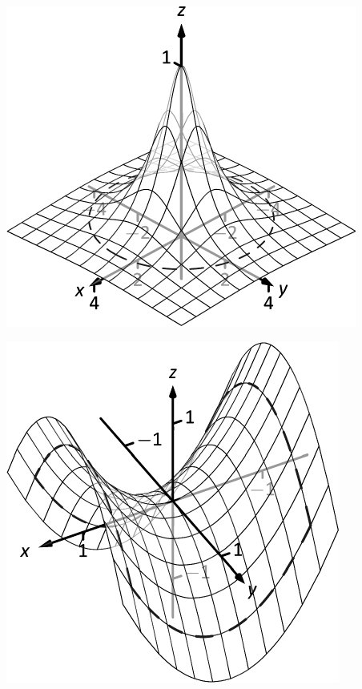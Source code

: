 \documentclass[10pt]{article}
\begin{document}
\includegraphics{fig13_05_ex_06_3DBW.pdf}
\texttt{}

\includegraphics{fig13_05_ex_07_3DBW.pdf}
\texttt{}
\end{document}
